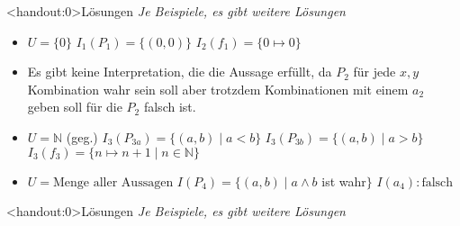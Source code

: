 {\begin{frame}<handout:0>{Lösungen}
	\textit{Je Beispiele, es gibt weitere Lösungen}
	\begin{itemize}[<+- | alert@+>]
		\item $U=\{0\}$ \only<1>{\\}\only<2->{; }
		      $I_1(P_1) = \{(0,0)\}$ 
		      $I_2(f_1) = \{0\mapsto 0\}$
		\item Es gibt keine Interpretation, die die Aussage erfüllt, da $P_2$ für jede $x,y$ Kombination wahr sein soll aber trotzdem Kombinationen mit einem $a_2$ geben soll für die $P_2$ falsch ist.
		\item $U=\mathbb{N}$ (geg.) \only<3>{\\}\only<4->{; }
		      $I_3(P_{3a}) = \{(a,b)\mid a < b\}$ \only<4->{; }
		      $I_3(P_{3b}) = \{(a,b)\mid a > b\}$ \only<4->{; }
		      $I_3(f_3) = \{n\mapsto n+1 \mid n\in \mathbb{N}\}$
		\item $U=\text{Menge aller Aussagen}$ \only<5->{; }
		      $I(P_4)=\{(a,b)\mid a \land b$ ist wahr$\}$ \only<5->{; }
		      $I(a_4): \text{falsch}$
	\end{itemize}

\end{frame}

\begin{frame}<handout:0>{Lösungen}
	\textit{Je Beispiele, es gibt weitere Lösungen}
	\par
	\par
\end{frame}

}
